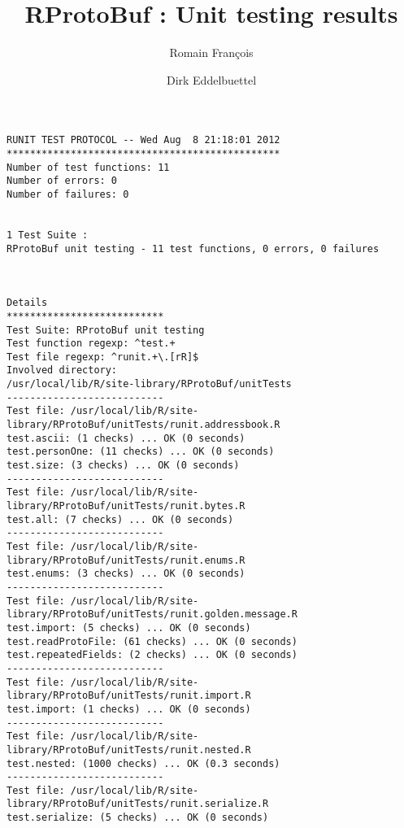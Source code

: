 \documentclass[10pt]{article}
\author{Romain Fran\c{c}ois \and Dirk Eddelbuettel}
\title{RProtoBuf : Unit testing results}
\begin{document}
\maketitle

\begin{verbatim}
RUNIT TEST PROTOCOL -- Wed Aug  8 21:18:01 2012 
*********************************************** 
Number of test functions: 11 
Number of errors: 0 
Number of failures: 0 

 
1 Test Suite : 
RProtoBuf unit testing - 11 test functions, 0 errors, 0 failures



Details 
*************************** 
Test Suite: RProtoBuf unit testing 
Test function regexp: ^test.+ 
Test file regexp: ^runit.+\.[rR]$ 
Involved directory: 
/usr/local/lib/R/site-library/RProtoBuf/unitTests 
--------------------------- 
Test file: /usr/local/lib/R/site-library/RProtoBuf/unitTests/runit.addressbook.R 
test.ascii: (1 checks) ... OK (0 seconds)
test.personOne: (11 checks) ... OK (0 seconds)
test.size: (3 checks) ... OK (0 seconds)
--------------------------- 
Test file: /usr/local/lib/R/site-library/RProtoBuf/unitTests/runit.bytes.R 
test.all: (7 checks) ... OK (0 seconds)
--------------------------- 
Test file: /usr/local/lib/R/site-library/RProtoBuf/unitTests/runit.enums.R 
test.enums: (3 checks) ... OK (0 seconds)
--------------------------- 
Test file: /usr/local/lib/R/site-library/RProtoBuf/unitTests/runit.golden.message.R 
test.import: (5 checks) ... OK (0 seconds)
test.readProtoFile: (61 checks) ... OK (0 seconds)
test.repeatedFields: (2 checks) ... OK (0 seconds)
--------------------------- 
Test file: /usr/local/lib/R/site-library/RProtoBuf/unitTests/runit.import.R 
test.import: (1 checks) ... OK (0 seconds)
--------------------------- 
Test file: /usr/local/lib/R/site-library/RProtoBuf/unitTests/runit.nested.R 
test.nested: (1000 checks) ... OK (0.3 seconds)
--------------------------- 
Test file: /usr/local/lib/R/site-library/RProtoBuf/unitTests/runit.serialize.R 
test.serialize: (5 checks) ... OK (0 seconds)\end{verbatim}
\end{document}
